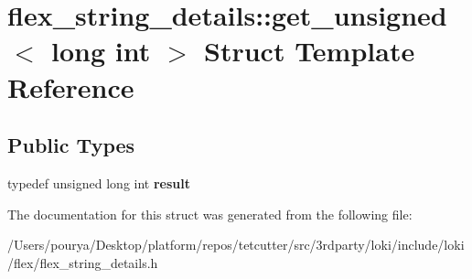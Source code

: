 \hypertarget{structflex__string__details_1_1get__unsigned_3_01long_01int_01_4}{}\section{flex\+\_\+string\+\_\+details\+:\+:get\+\_\+unsigned$<$ long int $>$ Struct Template Reference}
\label{structflex__string__details_1_1get__unsigned_3_01long_01int_01_4}
\subsection*{Public Types}
\begin{DoxyCompactItemize}
\item 
\hypertarget{structflex__string__details_1_1get__unsigned_3_01long_01int_01_4_a246daa4c1fa5b11cb6bf918e566b7a85}{}typedef unsigned long int {\bfseries result}\label{structflex__string__details_1_1get__unsigned_3_01long_01int_01_4_a246daa4c1fa5b11cb6bf918e566b7a85}

\end{DoxyCompactItemize}


The documentation for this struct was generated from the following file\+:\begin{DoxyCompactItemize}
\item 
/\+Users/pourya/\+Desktop/platform/repos/tetcutter/src/3rdparty/loki/include/loki/flex/flex\+\_\+string\+\_\+details.\+h\end{DoxyCompactItemize}
